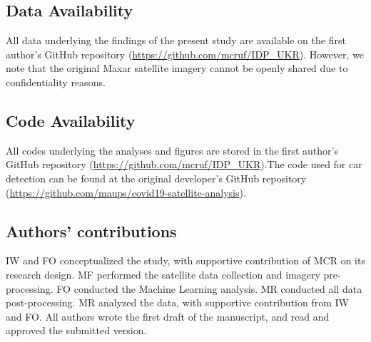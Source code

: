\documentclass[sn-basic]{sn-jnl}%
\begin{document}
{%



\subsection*{Data Availability}
All data underlying the findings of the present study are available on the first author's GitHub
repository (\url{https://github.com/mcruf/IDP_UKR}). However, we note that the original Maxar satellite imagery cannot be openly shared due to confidentiality reasons. 


\subsection*{Code Availability}
All codes underlying the analyses and figures are stored in the first author's GitHub repository (\url{https://github.com/mcruf/IDP_UKR}).The code used for car detection can be found at the original developer's GitHub repository (\url{https://github.com/maups/covid19-satellite-analysis}).


\subsection*{Authors' contributions}
IW and FO conceptualized the study, with supportive contribution of MCR on its research design. MF performed the satellite data collection and imagery pre-processing. FO conducted the Machine Learning analysis. MR conducted all data post-processing. MR analyzed the data, with supportive contribution from IW and FO. All authors wrote the first draft of the manuscript, and read and approved the submitted version.


\newpage
\begin{appendices}


\end{appendices}}
\end{document}

